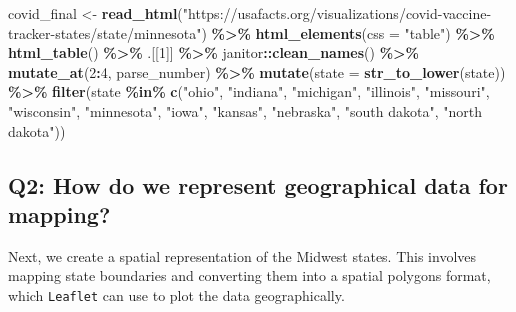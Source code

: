 \documentclass[
]{book}
\newenvironment{Shaded}{\begin{snugshade}}{\end{snugshade}}
\newcommand{\AttributeTok}[1]{\textcolor[rgb]{0.13,0.29,0.53}{#1}}
\newcommand{\DecValTok}[1]{\textcolor[rgb]{0.00,0.00,0.81}{#1}}
\newcommand{\FunctionTok}[1]{\textcolor[rgb]{0.13,0.29,0.53}{\textbf{#1}}}
\newcommand{\NormalTok}[1]{#1}
\newcommand{\OtherTok}[1]{\textcolor[rgb]{0.56,0.35,0.01}{#1}}
\newcommand{\SpecialCharTok}[1]{\textcolor[rgb]{0.81,0.36,0.00}{\textbf{#1}}}
\newcommand{\StringTok}[1]{\textcolor[rgb]{0.31,0.60,0.02}{#1}}
\begin{document}
\begin{Shaded}
\begin{Highlighting}[]
\NormalTok{covid\_final }\OtherTok{\textless{}{-}} \FunctionTok{read\_html}\NormalTok{(}\StringTok{"https://usafacts.org/visualizations/covid{-}vaccine{-}tracker{-}states/state/minnesota"}\NormalTok{) }\SpecialCharTok{\%\textgreater{}\%}
  \FunctionTok{html\_elements}\NormalTok{(}\AttributeTok{css =} \StringTok{"table"}\NormalTok{) }\SpecialCharTok{\%\textgreater{}\%} 
  \FunctionTok{html\_table}\NormalTok{() }\SpecialCharTok{\%\textgreater{}\%} 
\NormalTok{  .[[}\DecValTok{1}\NormalTok{]] }\SpecialCharTok{\%\textgreater{}\%}
\NormalTok{  janitor}\SpecialCharTok{::}\FunctionTok{clean\_names}\NormalTok{() }\SpecialCharTok{\%\textgreater{}\%}
  \FunctionTok{mutate\_at}\NormalTok{(}\DecValTok{2}\SpecialCharTok{:}\DecValTok{4}\NormalTok{, parse\_number) }\SpecialCharTok{\%\textgreater{}\%} 
  \FunctionTok{mutate}\NormalTok{(}\AttributeTok{state =} \FunctionTok{str\_to\_lower}\NormalTok{(state)) }\SpecialCharTok{\%\textgreater{}\%}
  \FunctionTok{filter}\NormalTok{(state }\SpecialCharTok{\%in\%} \FunctionTok{c}\NormalTok{(}\StringTok{"ohio"}\NormalTok{, }\StringTok{"indiana"}\NormalTok{, }\StringTok{"michigan"}\NormalTok{, }\StringTok{"illinois"}\NormalTok{, }\StringTok{"missouri"}\NormalTok{, }\StringTok{"wisconsin"}\NormalTok{, }\StringTok{"minnesota"}\NormalTok{, }
                      \StringTok{"iowa"}\NormalTok{, }\StringTok{"kansas"}\NormalTok{, }\StringTok{"nebraska"}\NormalTok{, }\StringTok{"south dakota"}\NormalTok{, }\StringTok{"north dakota"}\NormalTok{))}
\end{Highlighting}
\end{Shaded}

\hypertarget{q2-how-do-we-represent-geographical-data-for-mapping}{%
\subsection{Q2: How do we represent geographical data for mapping?}\label{q2-how-do-we-represent-geographical-data-for-mapping}}

Next, we create a spatial representation of the Midwest states. This involves mapping state boundaries and converting them into a spatial polygons format, which \texttt{Leaflet} can use to plot the data geographically.
\end{document}
